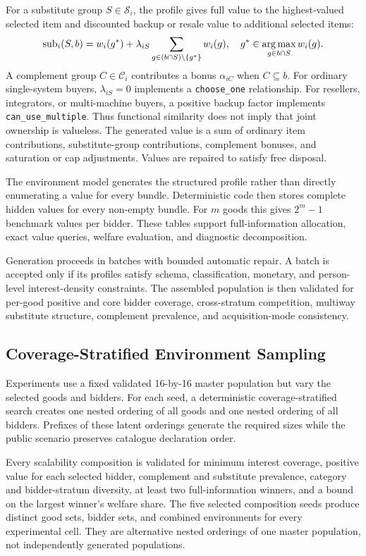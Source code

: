 For a substitute group \(S\in\mathcal{S}_i\), the profile gives full value to the highest-valued selected item and discounted backup or resale value to additional selected items:
\[
\operatorname{sub}_i(S,b)=
w_i(g^*)+\lambda_{iS}\sum_{g\in (b\cap S)\setminus\{g^*\}} w_i(g),
\quad
g^*\in\operatorname*{arg\,max}_{g\in b\cap S} w_i(g).
\]
A complement group \(C\in\mathcal{C}_i\) contributes a bonus
\(\alpha_{iC}\) when \(C\subseteq b\). For ordinary single-system buyers,
\(\lambda_{iS}=0\) implements a \texttt{choose\_one} relationship. For
resellers, integrators, or multi-machine buyers, a positive backup factor
implements \texttt{can\_use\_multiple}. Thus functional similarity does not
imply that joint ownership is valueless. The generated value is a sum of
ordinary item contributions, substitute-group contributions, complement
bonuses, and saturation or cap adjustments. Values are repaired to satisfy
free disposal.

The environment model generates the structured profile rather than directly
enumerating a value for every bundle. Deterministic code then stores complete
hidden values for every non-empty bundle. For \(m\) goods this gives
\(2^m-1\) benchmark values per bidder. These tables support full-information
allocation, exact value queries, welfare evaluation, and diagnostic
decomposition.

Generation proceeds in batches with bounded automatic repair. A batch is
accepted only if its profiles satisfy schema, classification, monetary, and
person-level interest-density constraints. The assembled population is then
validated for per-good positive and core bidder coverage, cross-stratum
competition, multiway substitute structure, complement prevalence, and
acquisition-mode consistency.

\subsection{Coverage-Stratified Environment Sampling}

Experiments use a fixed validated 16-by-16 master population but vary the
selected goods and bidders. For each seed, a deterministic
coverage-stratified search creates one nested ordering of all goods and one
nested ordering of all bidders. Prefixes of these latent orderings generate
the required sizes while the public scenario preserves catalogue declaration
order.

Every scalability composition is validated for minimum interest coverage,
positive value for each selected bidder, complement and substitute
prevalence, category and bidder-stratum diversity, at least two
full-information winners, and a bound on the largest winner's welfare share.
The five selected composition seeds produce distinct good sets, bidder sets,
and combined environments for every experimental cell. They are alternative
nested orderings of one master population, not independently generated
populations.

